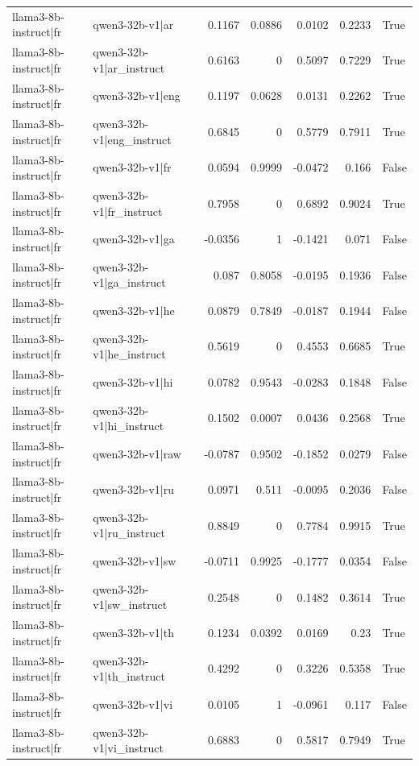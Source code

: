 \begin{table}
\begin{tabular}{l l r r r r l}
llama3-8b-instruct|fr & qwen3-32b-v1|ar & 0.1167 & 0.0886 & 0.0102 & 0.2233 & True \\
llama3-8b-instruct|fr & qwen3-32b-v1|ar_instruct & 0.6163 & 0 & 0.5097 & 0.7229 & True \\
llama3-8b-instruct|fr & qwen3-32b-v1|eng & 0.1197 & 0.0628 & 0.0131 & 0.2262 & True \\
llama3-8b-instruct|fr & qwen3-32b-v1|eng_instruct & 0.6845 & 0 & 0.5779 & 0.7911 & True \\
llama3-8b-instruct|fr & qwen3-32b-v1|fr & 0.0594 & 0.9999 & -0.0472 & 0.166 & False \\
llama3-8b-instruct|fr & qwen3-32b-v1|fr_instruct & 0.7958 & 0 & 0.6892 & 0.9024 & True \\
llama3-8b-instruct|fr & qwen3-32b-v1|ga & -0.0356 & 1 & -0.1421 & 0.071 & False \\
llama3-8b-instruct|fr & qwen3-32b-v1|ga_instruct & 0.087 & 0.8058 & -0.0195 & 0.1936 & False \\
llama3-8b-instruct|fr & qwen3-32b-v1|he & 0.0879 & 0.7849 & -0.0187 & 0.1944 & False \\
llama3-8b-instruct|fr & qwen3-32b-v1|he_instruct & 0.5619 & 0 & 0.4553 & 0.6685 & True \\
llama3-8b-instruct|fr & qwen3-32b-v1|hi & 0.0782 & 0.9543 & -0.0283 & 0.1848 & False \\
llama3-8b-instruct|fr & qwen3-32b-v1|hi_instruct & 0.1502 & 0.0007 & 0.0436 & 0.2568 & True \\
llama3-8b-instruct|fr & qwen3-32b-v1|raw & -0.0787 & 0.9502 & -0.1852 & 0.0279 & False \\
llama3-8b-instruct|fr & qwen3-32b-v1|ru & 0.0971 & 0.511 & -0.0095 & 0.2036 & False \\
llama3-8b-instruct|fr & qwen3-32b-v1|ru_instruct & 0.8849 & 0 & 0.7784 & 0.9915 & True \\
llama3-8b-instruct|fr & qwen3-32b-v1|sw & -0.0711 & 0.9925 & -0.1777 & 0.0354 & False \\
llama3-8b-instruct|fr & qwen3-32b-v1|sw_instruct & 0.2548 & 0 & 0.1482 & 0.3614 & True \\
llama3-8b-instruct|fr & qwen3-32b-v1|th & 0.1234 & 0.0392 & 0.0169 & 0.23 & True \\
llama3-8b-instruct|fr & qwen3-32b-v1|th_instruct & 0.4292 & 0 & 0.3226 & 0.5358 & True \\
llama3-8b-instruct|fr & qwen3-32b-v1|vi & 0.0105 & 1 & -0.0961 & 0.117 & False \\
llama3-8b-instruct|fr & qwen3-32b-v1|vi_instruct & 0.6883 & 0 & 0.5817 & 0.7949 & True \\

\end{tabular}
\end{table}
